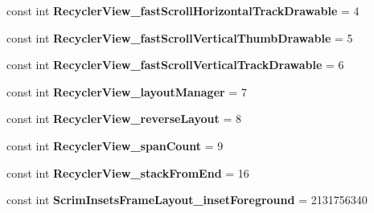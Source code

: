 \begin{DoxyCompactItemize}
\mbox{\label{classst_delivery_1_1_resource_1_1_styleable_a6873c40137c897b2089dac7250c71ea3}} 
const int {\bfseries Recycler\+View\+\_\+fast\+Scroll\+Horizontal\+Track\+Drawable} = 4
\item 
\mbox{\label{classst_delivery_1_1_resource_1_1_styleable_ab7cce9f212f8c69728f683944293dfd7}} 
const int {\bfseries Recycler\+View\+\_\+fast\+Scroll\+Vertical\+Thumb\+Drawable} = 5
\item 
\mbox{\label{classst_delivery_1_1_resource_1_1_styleable_a3c700fce1eb414aae6c65888264206a6}} 
const int {\bfseries Recycler\+View\+\_\+fast\+Scroll\+Vertical\+Track\+Drawable} = 6
\item 
\mbox{\label{classst_delivery_1_1_resource_1_1_styleable_ad169efc04b10b86911d50c890766ae6e}} 
const int {\bfseries Recycler\+View\+\_\+layout\+Manager} = 7
\item 
\mbox{\label{classst_delivery_1_1_resource_1_1_styleable_a084d4e8bc7aa8bca92f661f733ee7a35}} 
const int {\bfseries Recycler\+View\+\_\+reverse\+Layout} = 8
\item 
\mbox{\label{classst_delivery_1_1_resource_1_1_styleable_a202a2cd82634a17fe043c759be0a658f}} 
const int {\bfseries Recycler\+View\+\_\+span\+Count} = 9
\item 
\mbox{\label{classst_delivery_1_1_resource_1_1_styleable_aacab4246b68c86019cb607c92e05ebae}} 
const int {\bfseries Recycler\+View\+\_\+stack\+From\+End} = 16
\item 
\mbox{\label{classst_delivery_1_1_resource_1_1_styleable_a70ad17d0717b0845e30955b6c36f900d}} 
const int {\bfseries Scrim\+Insets\+Frame\+Layout\+\_\+inset\+Foreground} = 2131756340
\item 
\mbox{\label{classst_delivery_1_1_resource_1_1_styleable_a5db68d5447aabef24b7c6f5f6b345c9f}} 

\end{DoxyCompactItemize}
